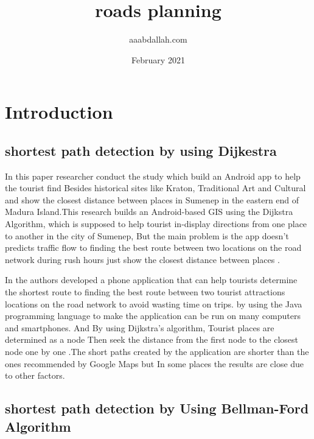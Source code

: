 \documentclass{article}
\title{roads planning}
\author{aaabdallah.com }
\date{February 2021}
\begin{document}
\maketitle

\section{Introduction}

\subsection{{shortest path detection by using Dijkestra }}


In this paper \cite{anam2019android} researcher conduct the study which build an Android app
to help the tourist find Besides historical sites like Kraton, Traditional Art and Cultural and show the closest distance between  places  in Sumenep  in the eastern end of Madura Island.This research builds an Android-based GIS using the Dijkstra Algorithm, which is supposed to help tourist in-display directions from one place to another in the city of Sumenep, But the main problem is the app doesn't  predicts traffic flow to  finding the best route between two locations on the road network during rush hours just show the closest distance between  places .


In \cite{iskandar2019development} the authors developed a phone application that can help tourists determine the shortest route to finding the best route between two tourist attractions locations on the road network to avoid wasting time on trips. by using the Java programming language to make the application can be run on many computers and smartphones.
 And By using Dijkstra's algorithm, Tourist places are determined as a node Then seek the distance from the first node to the closest node one by one .The short paths created by the application are shorter than the ones recommended by Google Maps but In some places the results are close due to other factors.

\subsection{ shortest path detection by Using Bellman-Ford Algorithm}
\end{document}

